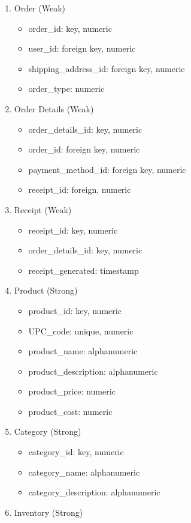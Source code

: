 \documentclass{article}
\begin{document}
\begin{enumerate}
\item Order (Weak)
    \begin{itemize}
        \item order\_id: key, numeric
        \item user\_id: foreign key, numeric
        \item shipping\_address\_id: foreign key, numeric
        \item order\_type: numeric
    \end{itemize}
\item Order Details (Weak)
    \begin{itemize}
        \item order\_details\_id: key, numeric
        \item order\_id: foreign key, numeric
        \item payment\_method\_id: foreign key, numeric
        \item receipt\_id: foreign, numeric
    \end{itemize}
\item Receipt (Weak)
    \begin{itemize}
        \item receipt\_id: key, numeric
        \item order\_details\_id: key, numeric
        \item receipt\_generated: timestamp
    \end{itemize}
\item Product (Strong)
    \begin{itemize}
        \item product\_id: key, numeric
        \item UPC\_code: unique, numeric
        \item product\_name: alphanumeric
        \item product\_description: alphanumeric
        \item product\_price: numeric
        \item product\_cost: numeric
    \end{itemize}
\item Category (Strong)
    \begin{itemize}
        \item category\_id: key, numeric
        \item category\_name: alphanumeric
        \item category\_description: alphanumeric
    \end{itemize}
\item Inventory (Strong)

\end{enumerate}
\end{document}
